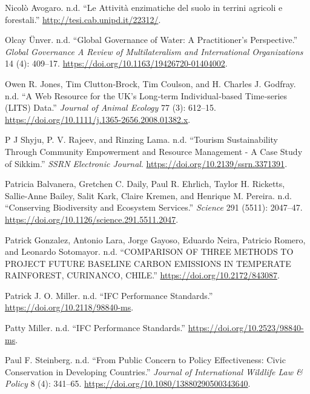 \begin{CSLReferences}{1}{0}
Nicolò Avogaro. n.d. {``Le Attività enzimatiche del suolo in terrini
agricoli e forestali.''} \url{http://tesi.cab.unipd.it/22312/}.

Olcay Ünver. n.d. {``Global Governance of Water: A Practitioner's
Perspective.''} \emph{Global Governance A Review of Multilateralism and
International Organizations} 14 (4): 409--17.
\url{https://doi.org/10.1163/19426720-01404002}.

Owen R. Jones, Tim Clutton‐Brock, Tim Coulson, and H. Charles J.
Godfray. n.d. {``A Web Resource for the UK's Long‐term Individual‐based
Time‐series (LITS) Data.''} \emph{Journal of Animal Ecology} 77 (3):
612--15. \url{https://doi.org/10.1111/j.1365-2656.2008.01382.x}.

P J Shyju, P. V. Rajeev, and Rinzing Lama. n.d. {``Tourism
Sustainability Through Community Empowerment and Resource Management - A
Case Study of Sikkim.''} \emph{SSRN Electronic Journal}.
\url{https://doi.org/10.2139/ssrn.3371391}.

Patricia Balvanera, Gretchen C. Daily, Paul R. Ehrlich, Taylor H.
Ricketts, Sallie-Anne Bailey, Salit Kark, Claire Kremen, and Henrique M.
Pereira. n.d. {``Conserving Biodiversity and Ecosystem Services.''}
\emph{Science} 291 (5511): 2047--47.
\url{https://doi.org/10.1126/science.291.5511.2047}.

Patrick Gonzalez, Antonio Lara, Jorge Gayoso, Eduardo Neira, Patricio
Romero, and Leonardo Sotomayor. n.d. {``COMPARISON OF THREE METHODS TO
PROJECT FUTURE BASELINE CARBON EMISSIONS IN TEMPERATE RAINFOREST,
CURINANCO, CHILE.''} \url{https://doi.org/10.2172/843087}.

Patrick J. O. Miller. n.d. {``IFC Performance Standards.''}
\url{https://doi.org/10.2118/98840-ms}.

Patty Miller. n.d. {``IFC Performance Standards.''}
\url{https://doi.org/10.2523/98840-ms}.

Paul F. Steinberg. n.d. {``From Public Concern to Policy Effectiveness:
Civic Conservation in Developing Countries.''} \emph{Journal of
International Wildlife Law \& Policy} 8 (4): 341--65.
\url{https://doi.org/10.1080/13880290500343640}.


\end{CSLReferences}
